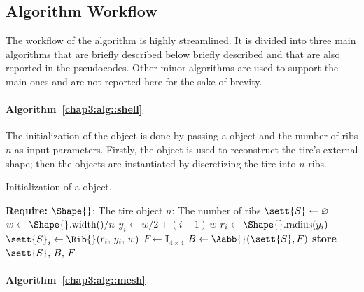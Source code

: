 \subsection{Algorithm Workflow}
\label{chap3:AlgorithmWorkflow}

The workflow of the algorithm is highly streamlined. It is divided into three main algorithms that are briefly described below briefly described and that are also reported in the pseudocodes. Other minor algorithms are used to support the main ones and are not reported here for the sake of brevity.

\paragraph*{Algorithm~\ref{chap3:alg::shell}}

The initialization of the \Shell{} object is done by passing a \Shape{} object and the number of ribs $n$ as input parameters. Firstly, the \Shape{} object is used to reconstruct the tire's external shape; then the \Rib{} objects are instantiated by discretizing the tire into $n$ ribs.

\begin{breakablealgorithm}
  \caption{Initialization of a \Shell{} object.}
  \label{chap3:alg::shell}
  \begin{algorithmic}[1]
    \State \textbf{Require:} $\Shape{}$: The tire \Shape{} object
    \State {} $n$: The number of ribs
     
      \State $\sett{S} \gets \varnothing$ 
      \State $w \gets \Shape{}.\text{width}()/n$ 
        \State $y_i \gets w/2 + (i-1)\,w$ 
        \State $r_i \gets \Shape{}.\text{radius}(y_i)$ 
        \State $\sett{S}_i \gets \Rib{}(r_i, \, y_i, \, w)$ 
      \EndFor
      \State $F \gets \mathbf{I}_{4 \times 4}$ 
      \State $B \gets \Aabb{}(\sett{S}, F)$ 
      \State \textbf{store} $\sett{S}, \, B, \, F$ 
      \EndFunction
  \end{algorithmic}
\end{breakablealgorithm}

\paragraph*{Algorithm~\ref{chap3:alg::mesh}}

